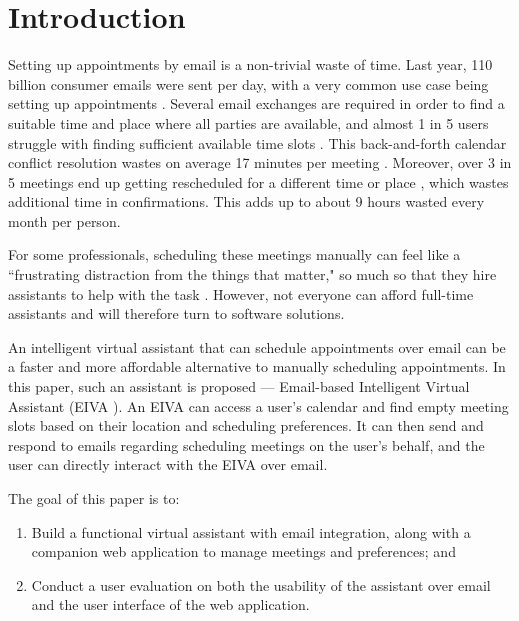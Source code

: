 \documentclass{article}
\begin{document}
\newpage

\listoftables

\listoffigures

\newpage

\cleardoublepage
{}


\section{Introduction}

Setting up appointments by email is a non-trivial waste of time. Last year, 110 billion consumer emails were sent per day, with a very common use case being setting up appointments \cite{noauthor_email_2019}. Several email exchanges are required in order to find a suitable time and place where all parties are available, and almost 1 in 5 users struggle with finding sufficient available time slots \cite{blaszkiewicz_research_2018}. This back-and-forth calendar conflict resolution wastes on average 17 minutes per meeting \cite{dennis_4_2017}. Moreover, over 3 in 5 meetings end up getting rescheduled for a different time or place \cite{dennis_how_2018}, which wastes additional time in confirmations. This adds up to about 9 hours wasted every month per person.

For some professionals, scheduling these meetings manually can feel like a ``frustrating distraction from the things that matter," so much so that they hire assistants to help with the task \cite{cranshaw_calendar.help:_2017}. However, not everyone can afford full-time assistants and will therefore turn to software solutions.

An intelligent virtual assistant that can schedule appointments over email can be a faster and more affordable alternative to manually scheduling appointments. In this paper, such an assistant is proposed --- Email-based Intelligent Virtual Assistant (EIVA ). An EIVA can access a user's calendar and find empty meeting slots based on their location and scheduling preferences. It can then send and respond to emails regarding scheduling meetings on the user's behalf, and the user can directly interact with the EIVA over email.

The goal of this paper is to:

\begin{enumerate}
	\item Build a functional virtual assistant with email integration, along with a companion web application to manage meetings and preferences; and
	\item Conduct a user evaluation on both the usability of the assistant over email and the user interface of the web application.
\end{enumerate}
\end{document}
